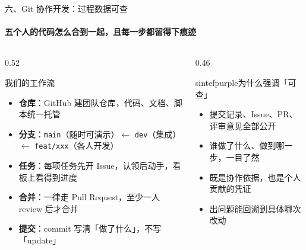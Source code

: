 \documentclass{beamer}
\begin{document}
\begin{frame}{六、Git 协作开发：过程数据可查}
\framesubtitle{五个人的代码怎么合到一起，且每一步都留得下痕迹}
\footnotesize
\begin{columns}[t]
\begin{column}{0.52\textwidth}
\begin{block}{我们的工作流}
\begin{itemize}
\item \textbf{仓库}：GitHub 建团队仓库，代码、文档、脚本统一托管
\item \textbf{分支}：\texttt{main}（随时可演示）$\leftarrow$ \texttt{dev}（集成）$\leftarrow$ \texttt{feat/xxx}（各人开发）
\item \textbf{任务}：每项任务先开 Issue，认领后动手，看板上看得到进度
\item \textbf{合并}：一律走 Pull Request，至少一人 review 后才合并
\item \textbf{提交}：commit 写清「做了什么」，不写「update」
\end{itemize}
\end{block}
\end{column}
\begin{column}{0.46\textwidth}
\begin{colorblock}[white]{sintefpurple}{为什么强调「可查」}
\begin{itemize}
\item 提交记录、Issue、PR、评审意见全部公开
\item 谁做了什么、做到哪一步，一目了然
\item 既是协作依据，也是个人贡献的凭证
\item 出问题能回溯到具体哪次改动
\end{itemize}
\end{colorblock}
\end{column}
\end{columns}
\end{frame}
\end{document}
